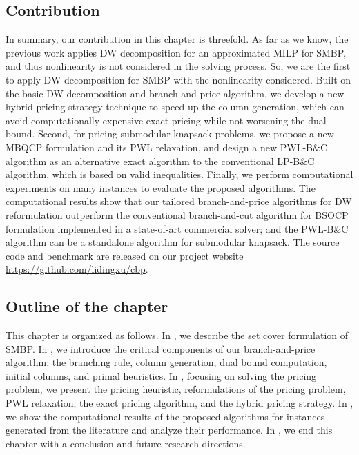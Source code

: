 \subsection{Contribution}

In summary, our contribution in this chapter is threefold. As far as we know, the previous work applies DW decomposition for an approximated MILP for SMBP, and thus nonlinearity is not considered in the solving process. So, we are the first to apply  DW decomposition for SMBP with the nonlinearity considered. Built on the basic DW decomposition and branch-and-price algorithm, we develop a new hybrid pricing strategy technique to speed up the column generation, which can avoid computationally expensive exact pricing while not worsening the dual bound.  Second, for pricing submodular knapsack problems, we  propose a new MBQCP formulation and its PWL relaxation, and design a new PWL-B$\&$C algorithm  as an alternative  exact algorithm to the conventional LP-B$\&$C algorithm, which is  based on valid inequalities. Finally, we perform computational experiments on many instances to evaluate the proposed algorithms. The computational results show that our tailored branch-and-price algorithms for DW reformulation outperform the conventional branch-and-cut algorithm for BSOCP formulation implemented in a state-of-art commercial solver; and the PWL-B$\&$C algorithm can be a standalone algorithm for submodular knapsack. The source code and benchmark are released on our project website \href{https://github.com/lidingxu/cbp}{https://github.com/lidingxu/cbp}.

\subsection{Outline of the chapter}
 This chapter is organized as follows. In , we describe the set cover formulation of SMBP. In , we introduce the critical components of our branch-and-price algorithm: the branching rule, column generation, dual bound computation, initial columns, and primal heuristics. In , focusing on solving the pricing problem, we present the pricing heuristic, reformulations of the pricing problem, PWL relaxation, the exact pricing algorithm, and the hybrid pricing strategy. In , we show the computational results of the proposed algorithms for instances generated from the literature and analyze their performance. In , we end this chapter with a conclusion and future research directions.




